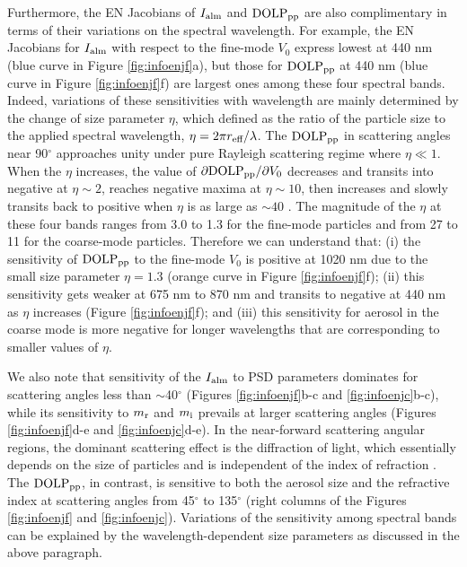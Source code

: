 Furthermore, the EN Jacobians of $I_\text{alm}$ and $\text{DOLP}_\text{pp}$ are also complimentary 
in terms of their variations on the spectral wavelength. For example, the EN
Jacobians for $I_\text{alm}$ with respect to the fine-mode $V_0$ express lowest at 
440 nm (blue curve in Figure \ref{fig:infoenjf}a), but those for $\text{DOLP}_\text{pp}$ at 
440 nm (blue curve in Figure \ref{fig:infoenjf}f) are largest ones among these
four spectral bands. Indeed, variations of these sensitivities with wavelength
are mainly determined by the change of size parameter $\eta$, which defined 
as the ratio of the particle size to the applied spectral wavelength, 
$\eta=2\pi r_\text{eff}/\lambda$. The $\text{DOLP}_\text{pp}$ in scattering angles near 90$^\circ$
approaches unity under pure Rayleigh scattering regime where $\eta \ll 1$. 
When the  $\eta$ increases, the value of $\partial\text{DOLP}_\text{pp}/\partial{V_0}$ 
decreases and transits into negative at $\eta \sim 2$, reaches negative 
maxima at $\eta \sim 10$, then increases and slowly transits back to positive
when $\eta$ is as large as $\sim 40$ \citep{Hansen74}. The magnitude of the 
$\eta$ at these four bands ranges from 3.0 to 1.3 for the fine-mode particles 
and from 27 to 11 for the coarse-mode particles. Therefore we can understand 
that: (i) the sensitivity of $\text{DOLP}_\text{pp}$ to the fine-mode $V_0$ is
positive at 1020 nm due to the small size parameter $\eta=1.3$ (orange curve 
in Figure \ref{fig:infoenjf}f); (ii) this sensitivity gets weaker at 675 nm to
 870 nm and transits to negative at 440 nm as $\eta$ increases 
(Figure \ref{fig:infoenjf}f); and (iii) this sensitivity for aerosol in the 
coarse mode is more negative for longer wavelengths that are
corresponding to smaller values of $\eta$. 

We also note that sensitivity of the $I_\text{alm}$ to PSD parameters dominates for
scattering angles less than $\sim$40$^\circ$ (Figures \ref{fig:infoenjf}b-c and 
\ref{fig:infoenjc}b-c), while its sensitivity to $m_\text{r}$ and $m_\text{i}$ 
prevails at larger scattering angles (Figures \ref{fig:infoenjf}d-e and
\ref{fig:infoenjc}d-e). In the near-forward scattering angular regions, the 
dominant scattering effect is the diffraction of light, which essentially 
depends on the size of particles and is independent of the index of refraction
\citep{vandeHulst81, Hansen74}. The $\text{DOLP}_\text{pp}$, in contrast, is sensitive to both
the aerosol size and the refractive index at scattering angles from 45$^\circ$ 
to 135$^\circ$ (right columns of the Figures \ref{fig:infoenjf} and
\ref{fig:infoenjc}). Variations of the sensitivity among spectral bands can be
explained by the wavelength-dependent size parameters as discussed in the above
paragraph.  

